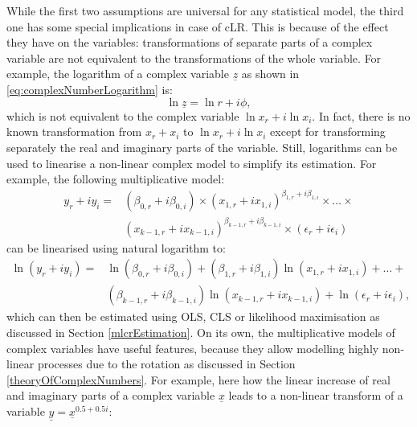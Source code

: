 \documentclass[
]{book}
\begin{document}
While the first two assumptions are universal for any statistical model, the third one has some special implications in case of cLR. This is because of the effect they have on the variables: transformations of separate parts of a complex variable are not equivalent to the transformations of the whole variable. For example, the logarithm of a complex variable \(\underline{z}\) as shown in \eqref{eq:complexNumberLogarithm} is:
\begin{equation*}
    \ln \underline{z} = \ln r + i \phi ,
\end{equation*}
which is not equivalent to the complex variable \(\ln x_r + i \ln x_i\). In fact, there is no known transformation from \(x_r + x_i\) to \(\ln x_r + i \ln x_i\) except for transforming separately the real and imaginary parts of the variable. Still, logarithms can be used to linearise a non-linear complex model to simplify its estimation. For example, the following multiplicative model:
\begin{equation*}
    \begin{aligned}
    y_{r} + i y_{i} = & (\beta_{0,r} + i \beta_{0,i}) \times (x_{1,r} + i x_{1,i}) ^{\beta_{1,r} + i \beta_{1,i}} \times \dots \times \\
                      & (x_{k-1,r} + i x_{k-1,i}) ^{\beta_{k-1,r} + i \beta_{k-1,i}} \times (\epsilon_{r} + i \epsilon_{i})
    \end{aligned}
\end{equation*}
can be linearised using natural logarithm to:
\begin{equation*}
    \begin{aligned}
    \ln (y_{r} + i y_{i}) = & \ln (\beta_{0,r} + i \beta_{0,i}) + (\beta_{1,r} + i \beta_{1,i}) \ln(x_{1,r} + i x_{1,i}) + \dots + \\
                            & (\beta_{k-1,r} + i \beta_{k-1,i}) \ln (x_{k-1,r} + i x_{k-1,i}) + \ln (\epsilon_{r} + i \epsilon_{i}),
    \end{aligned}
\end{equation*}
which can then be estimated using OLS, CLS or likelihood maximisation as discussed in Section \ref{mlcrEstimation}. On its own, the multiplicative models of complex variables have useful features, because they allow modelling highly non-linear processes due to the rotation as discussed in Section \ref{theoryOfComplexNumbers}. For example, here how the linear increase of real and imaginary parts of a complex variable \(\underline{x}\) leads to a non-linear transform of a variable \(\underline{y}=\underline{x}^{0.5+0.5i}\):
\end{document}
